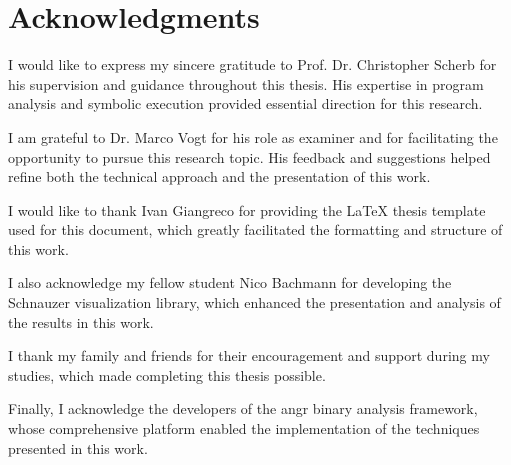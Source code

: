 \chapter{Acknowledgments}

I would like to express my sincere gratitude to Prof. Dr. Christopher Scherb for his supervision and guidance throughout this thesis. His expertise in program analysis and symbolic execution provided essential direction for this research.

I am grateful to Dr. Marco Vogt for his role as examiner and for facilitating the opportunity to pursue this research topic. His feedback and suggestions helped refine both the technical approach and the presentation of this work.

I would like to thank Ivan Giangreco for providing the LaTeX thesis template used for this document, which greatly facilitated the formatting and structure of this work.

I also acknowledge my fellow student Nico Bachmann for developing the Schnauzer visualization library, which enhanced the presentation and analysis of the results in this work.

I thank my family and friends for their encouragement and support during my studies, which made completing this thesis possible.

Finally, I acknowledge the developers of the angr binary analysis framework, whose comprehensive platform enabled the implementation of the techniques presented in this work.
